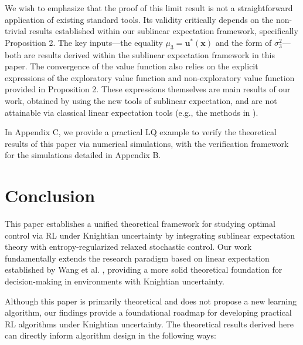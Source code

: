 \documentclass[onecolumn, journal]{IEEEtran} %
\begin{document}
	We wish to emphasize that the proof of this limit result is not a straightforward application of existing standard tools. Its validity critically depends on the non-trivial results established within our sublinear expectation framework, specifically Proposition 2. The key inputs---the equality $\mu_3 = \boldsymbol{u^*(x)}$ and the form of $\sigma_3^2$---both are results derived within the sublinear expectation framework in this paper. The convergence of the value function also relies on the explicit expressions of the exploratory value function and non-exploratory value function provided in Proposition 2. These expressions themselves are main results of our work, obtained by using the new tools of sublinear expectation, and are not attainable via classical linear expectation tools (e.g., the methods in \cite{wang2020reinforcement}).
	
In Appendix C, we provide a practical LQ example to verify the theoretical results of this paper via numerical simulations, with the verification framework for the simulations detailed in Appendix B.
	
	\section{Conclusion}
	This paper establishes a unified theoretical framework for studying optimal control via RL under Knightian uncertainty by integrating sublinear expectation theory with entropy-regularized relaxed stochastic control. Our work fundamentally extends the research paradigm based on linear expectation established by Wang et al. \cite{wang2020reinforcement}, providing a more solid theoretical foundation for decision-making in environments with Knightian uncertainty.
	
	Although this paper is primarily theoretical and does not propose a new learning algorithm, our findings provide a foundational roadmap for developing practical RL algorithms under Knightian uncertainty. The theoretical results derived here can directly inform algorithm design in the following ways:
	
\end{document}
